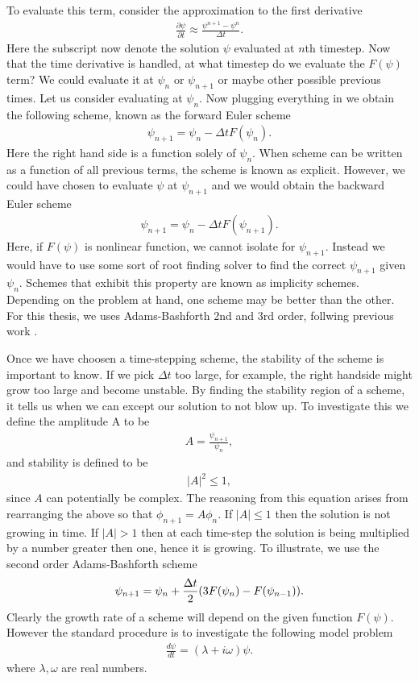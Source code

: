 To evaluate this term, consider the approximation to the first derivative \cite{durran}
\begin{align}
\frac{\partial \psi}{\partial t} \approx  \frac{\psi^{n+1}-\psi^{n}}{\Delta t}.
\end{align}
Here the subscript now denote the solution $\psi$ evaluated at $n$th timestep. Now that the time derivative is handled, at what timestep do we evaluate the $F(\psi)$ term? We could evaluate it at $\psi_{n}$ or $\psi_{n+1}$ or maybe other possible previous times. Let us consider evaluating at $\psi_{n}$. Now plugging everything in we obtain the following scheme, known as the forward Euler scheme \cite{durran}
\begin{align}
\psi_{n+1} = \psi_{n} - \Delta t F(\psi_{n}).
\end{align} 
Here the right hand side is a function solely of $\psi_{n}$. When scheme can be written as a function of all previous terms, the scheme is known as explicit. However, we could have chosen to evaluate $\psi$ at $\psi_{n+1}$ and we would obtain the backward Euler scheme \cite{durran} 
\begin{align}
\psi_{n+1} = \psi_{n} - \Delta t F(\psi_{n+1}).
\end{align} 
Here, if $F(\psi)$ is nonlinear function, we cannot isolate for $\psi_{n+1}$. Instead we would have to use some sort of root finding solver to find the correct $\psi_{n+1}$ given $\psi_{n}$. Schemes that exhibit this property are known as implicity schemes. Depending on the problem at hand, one scheme may be better than the other. For this thesis, we uses Adams-Bashforth 2nd and 3rd order, follwing previous work \cite{bc2000c,waitesmol2008}.

Once we have choosen a time-stepping scheme, the stability of the scheme is important to know. If we pick $\Delta t$ too large, for example, the right handside might grow too large and become unstable. By finding the stability region of a scheme, it tells us when we can except our solution to not blow up. To investigate this we define the amplitude A to be
\begin{align}
A = \frac{\psi_{n+1}}{\psi_{n}},
\end{align}
and stability is defined to be 
\begin{align}
|A|^{2} \le 1,
\end{align}
since $A$ can potentially be complex. The reasoning from this equation arises from rearranging the above so that $\phi_{n+1}=A\phi_{n}$. If $|A|\le 1$ then the solution is not growing in time. If $|A|>1$ then at each time-step the solution is being multiplied by a number greater then one, hence it is growing.  To illustrate, we use the second order Adams-Bashforth scheme \cite{durran}
\begin{align}
\psi_{n+1} = \psi_{n} + \frac{\Delta t}{2}(3F(\psi_{n}) - F(\psi_{n-1})).
\end{align} 
Clearly the growth rate of a scheme will depend on the given function $F(\psi)$. However the standard procedure is to investigate the following model problem \cite{durran}
\begin{align}
\frac{d\psi}{dt} =  (\lambda + i\omega)\psi.
\end{align}
where $\lambda,\omega$ are real numbers. 

